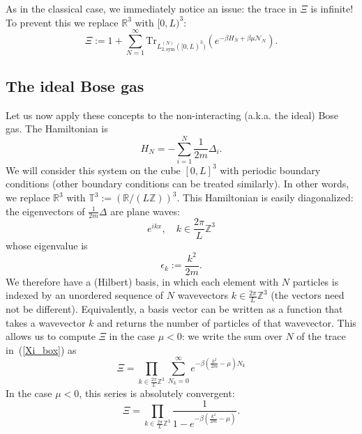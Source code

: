 \documentclass{ian}
\begin{document}
\indent
As in the classical case, we immediately notice an issue: the trace in $\Xi$ is infinite!
To prevent this we replace $\mathbb R^3$ with $[0,L)^3$:
\begin{equation}
  \Xi:=
  1+
  \sum_{N=1}^\infty
  \mathrm{Tr}_{L_{2,\mathrm{sym}}^{(N)}([0,L)^3)}(e^{-\beta H_N+\beta \mu\mathcal N_N})
  .
  \label{Xi_box}
\end{equation}

\subsection{The ideal Bose gas}
\indent
Let us now apply these concepts to the non-interacting (a.k.a. the ideal) Bose gas.
The Hamiltonian is
\begin{equation}
  H_N=-\sum_{i=1}^N\frac1{2m}\Delta_{i}
  .
\end{equation}
We will consider this system on the cube $[0,L]^3$ with periodic boundary conditions (other boundary conditions can be treated similarly).
In other words, we replace $\mathbb R^3$ with $\mathbb T^3:=(\mathbb R/(L\mathbb Z))^3$.
This Hamiltonian is easily diagonalized: the eigenvectors of $\frac1{2m}\Delta$ are plane waves:
\begin{equation}
  e^{ikx}
  ,\quad
  k\in\frac{2\pi}L\mathbb Z^3
\end{equation}
whose eigenvalue is
\begin{equation}
  \epsilon_k:=\frac{k^2}{2m}
  .
\end{equation}
We therefore have a (Hilbert) basis, in which each element with $N$ particles is indexed by an unordered sequence of $N$ wavevectors $k\in\frac{2\pi}L\mathbb Z^3$ (the vectors need not be different).
Equivalently, a basis vector can be written as a function that takes a wavevector $k$ and returns the number of particles of that wavevector.
This allows us to compute $\Xi$ in the case $\mu<0$: we write the sum over $N$ of the trace in\-~(\ref{Xi_box}) as
\begin{equation}
  \Xi=
  \prod_{k\in\frac{2\pi}L\mathbb Z^3}
  \sum_{N_k=0}^\infty
  e^{-\beta(\frac{k^2}{2m}-\mu)N_k}
\end{equation}
In the case $\mu<0$, this series is absolutely convergent:
\begin{equation}
  \Xi=
  \prod_{k\in\frac{2\pi}L\mathbb Z^3}
  \frac1{1-e^{-\beta(\frac{k^2}{2m}-\mu)}}
  .
  \label{Xi_ideal}
\end{equation}
\bigskip
\end{document}
